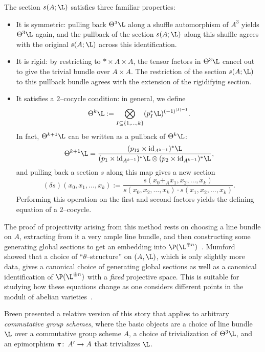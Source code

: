 \begin{remark}
The section $s(A; \L)$ satisfies three familiar properties:
\begin{itemize}
\item It is symmetric: pulling back $\Theta^3 \L$ along a shuffle automorphism of $A^3$ yields $\Theta^3 \L$ again, and the pullback of the section $s(A; \L)$ along this shuffle agrees with the original $s(A; \L)$ across this identification.
\item It is rigid: by restricting to $* \times A \times A$, the tensor factors in $\Theta^3 \L$ cancel out to give the trivial bundle over $A \times A$.  The restriction of the section $s(A; \L)$ to this pullback bundle agrees with the extension of the rigidifying section.
\item It satisfies a $2$--cocycle condition: in general, we define \[\Theta^k \L := \bigotimes_{I \subseteq \{1, \ldots, k\}} (p_I^* \L)^{(-1)^{|I| - 1}}.\]  In fact, $\Theta^{k+1} \L$ can be written as a pullback of $\Theta^k \L$: \[\Theta^{k+1} \L = \frac{(p_{12} \times \id_{A^{k-1}})^* \L}{(p_1 \times \id_{A^{k-1}})^* \L \otimes (p_2 \times \id_{A^{k-1}})^* \L},\] and pulling back a section $s$ along this map gives a new section \[(\delta s)(x_0, x_1, \ldots, x_k) := \frac{s(x_0 +_A x_1, x_2, \ldots, x_k)}{s(x_0, x_2, \ldots, x_k) \cdot s(x_1, x_2, \ldots, x_k)}.\]  Performing this operation on the first and second factors yields the defining equation of a $2$--cocycle.
\end{itemize}
\end{remark}

\begin{remark}
The proof of projectivity arising from this method rests on choosing a line bundle on $A$, extracting from it a very ample line bundle, and then constructing some generating global sections to get an embedding into $\P(\L^{\oplus n})$~\cite[Remark II.7.8.2]{Hartshorne}.  Mumford~\cite{MumfordEquationsI} showed that a choice of ``$\theta$--structure'' on $(A, \L)$, which is only slightly more data, gives a canonical choice of generating global sections as well as a canonical identification of $\P(\L^{\oplus n})$ with a \emph{fixed} projective space.  This is suitable for studying how these equations change as one considers different points in the moduli of abelian varieties~\cite{MumfordEquationsII,MumfordEquationsIII}.
\end{remark}

\begin{remark}
Breen presented a relative version of this story that applies to arbitrary \emph{commutative group schemes}, where the basic objects are a choice of line bundle $\L$ over a commutative group scheme $A$, a choice of trivialization of $\Theta^3 \L$, and an epimorphism $\pi\colon\thinspace A' \to A$ that trivializes $\L$.
\end{remark}

